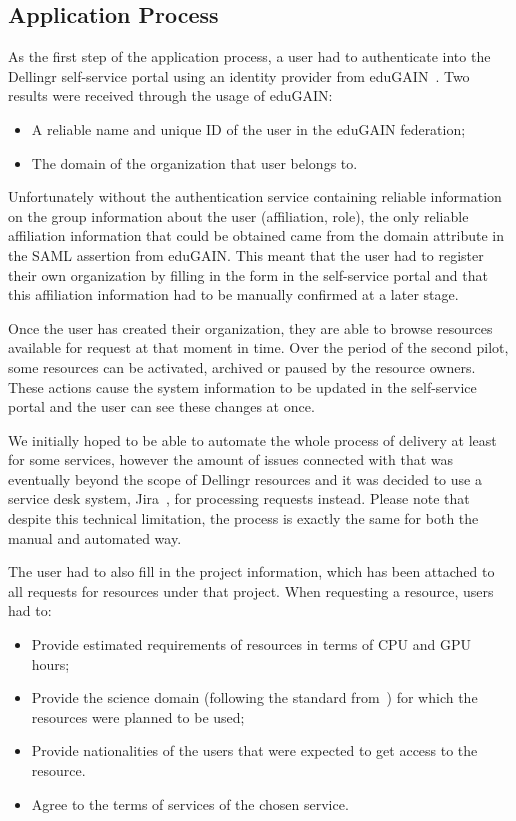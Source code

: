 \documentclass{article}
\newcommand{\dell}{Dellingr\xspace}
\begin{document}
\subsection{Application Process}
\label{ssec:application}

As the first step of the application process, a user had to authenticate into the \dell self-service portal using an identity provider from eduGAIN~\cite{edugain}. 
Two results were received through the usage of eduGAIN:
\begin{itemize}
    \item A reliable name and unique ID of the user in the eduGAIN federation;
    \item The domain of the organization that user belongs to.
\end{itemize}
Unfortunately without the authentication service containing reliable information on the group information about the user (affiliation, role), 
the only reliable affiliation information that could be obtained came from the domain attribute in the SAML assertion from eduGAIN. 
This meant that the user had to register their own organization by filling in the form in the self-service portal and that this affiliation information had to be manually confirmed at a later stage.

Once the user has created their organization, they are able to browse resources available for request at that moment in time. 
Over the period of the second pilot, some resources can be activated, archived or paused by the resource owners.
These actions cause the system information to be updated in the self-service portal and the user can see these changes at once.

We initially hoped to be able to automate the whole process of delivery at least for some services, however the amount of issues connected with that was eventually beyond the scope of \dell resources and it was decided to use a service desk system, Jira~\cite{jira}, for processing requests instead. 
Please note that despite this technical limitation, the process is exactly the same for both the manual and automated way.

The user had to also fill in the project information, which has been attached to all requests for resources under that project.
When requesting a resource, users had to:
\begin{itemize}
    \item Provide estimated requirements of resources in terms of CPU and GPU hours;
    \item Provide the science domain (following the standard from~\cite{science-domains}) for which the resources were planned to be used;
    \item Provide nationalities of the users that were expected to get access to the resource.
    \item Agree to the terms of services of the chosen service.
\end{itemize}
\end{document}
